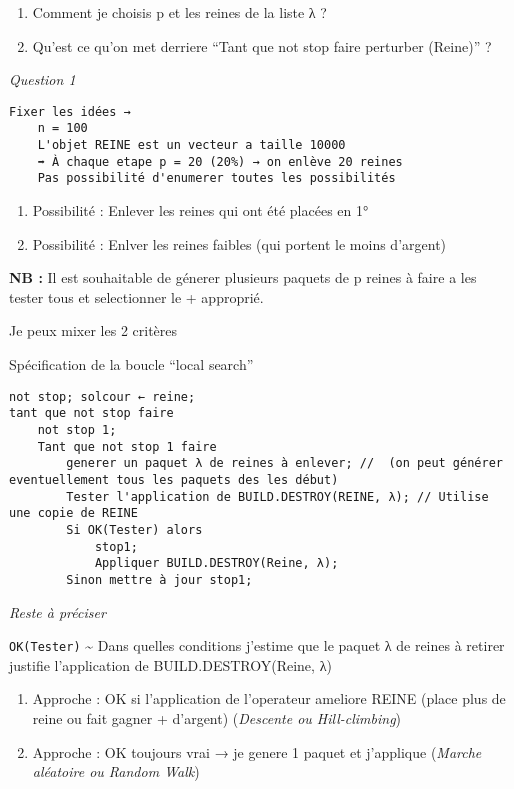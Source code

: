 \documentclass[]{article}
\begin{document}
\begin{enumerate}
\def\labelenumi{\arabic{enumi}.}
\tightlist
\item
  Comment je choisis p et les reines de la liste λ ?
\item
  Qu'est ce qu'on met derriere ``Tant que not stop faire perturber
  (Reine)'' ?
\end{enumerate}

\emph{Question 1}

\begin{verbatim}
Fixer les idées →
    n = 100
    L'objet REINE est un vecteur a taille 10000
    ➡ À chaque etape p = 20 (20%) → on enlève 20 reines
    Pas possibilité d'enumerer toutes les possibilités
\end{verbatim}

\begin{enumerate}
\def\labelenumi{\arabic{enumi}.}
\tightlist
\item
  Possibilité : Enlever les reines qui ont été placées en 1°
\item
  Possibilité : Enlver les reines faibles (qui portent le moins
  d'argent)
\end{enumerate}

\textbf{NB :} Il est souhaitable de génerer plusieurs paquets de p
reines à faire a les tester tous et selectionner le + approprié.

Je peux mixer les 2 critères

Spécification de la boucle ``local search''

\begin{verbatim}
not stop; solcour ← reine;
tant que not stop faire
    not stop 1;
    Tant que not stop 1 faire
        generer un paquet λ de reines à enlever; //  (on peut générer eventuellement tous les paquets des les début)
        Tester l'application de BUILD.DESTROY(REINE, λ); // Utilise une copie de REINE
        Si OK(Tester) alors
            stop1;
            Appliquer BUILD.DESTROY(Reine, λ);
        Sinon mettre à jour stop1;
\end{verbatim}

\emph{Reste à préciser}

\texttt{OK(Tester)} \textasciitilde{} Dans quelles conditions j'estime
que le paquet λ de reines à retirer justifie l'application de
BUILD.DESTROY(Reine, λ)

\begin{enumerate}
\def\labelenumi{\arabic{enumi}.}
\item
  Approche : OK si l'application de l'operateur ameliore REINE (place
  plus de reine ou fait gagner + d'argent) (\emph{Descente ou
  Hill-climbing})
\item
  Approche : OK toujours vrai → je genere 1 paquet et j'applique
  (\emph{Marche aléatoire ou Random Walk})
\end{enumerate}
\end{document}
